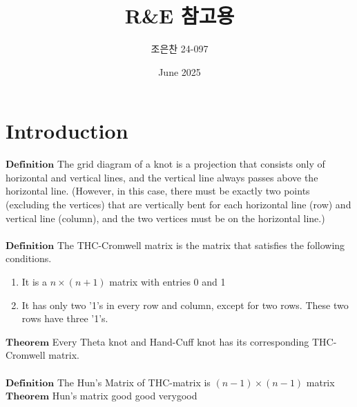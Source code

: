 \documentclass{article}
\title{R\&E 참고용}
\author{조은찬 24-097}
\date{June 2025}
\begin{document}
\maketitle

\section{Introduction}
$\mathbf{Definition}$ The grid diagram of a knot is a projection that consists only of horizontal and vertical lines, and the vertical line always passes above the horizontal line. (However, in this case, there must be exactly two points (excluding the vertices) that are vertically bent for each horizontal line (row) and vertical line (column), and the two vertices must be on the horizontal line.) \\ \\
$\mathbf{Definition}$ The THC-Cromwell matrix is the matrix that satisfies the following conditions.
\begin{enumerate}
    \item It is a $n\times(n+1)$ matrix with entries 0 and 1
    \item It has only two '1's in every row and column, except for two rows. These two rows have three '1's.
\end{enumerate}
$\mathbf{Theorem}$ Every Theta knot and Hand-Cuff knot has its corresponding THC-Cromwell matrix. \\ \\
$\mathbf{Definition}$ The Hun's Matrix of THC-matrix is $(n-1)\times(n-1)$ matrix \\
$\mathbf{Theorem}$ 
Hun's matrix good good verygood
\end{document}
